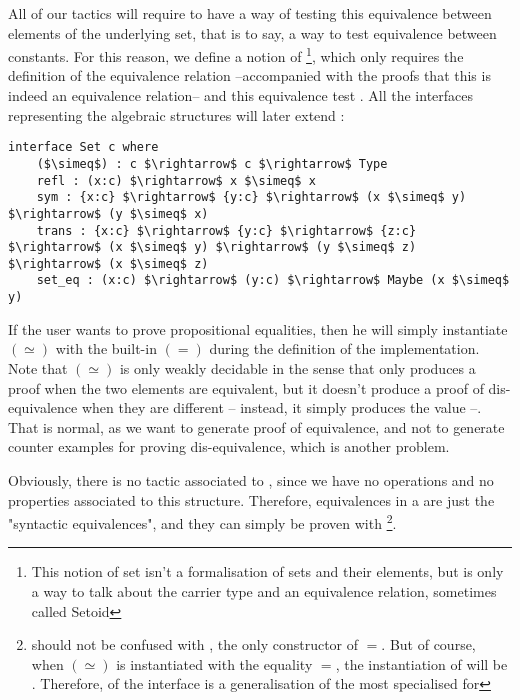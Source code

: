 All of our tactics will require to have a way of testing this equivalence between elements of the underlying set, that is to say, a way to test equivalence between constants. For this reason, we define a notion of \footnote{This notion of set isn't a formalisation of sets and their elements, but is only a way to talk about the carrier type and an equivalence relation, sometimes called Setoid}, which only requires the definition of the equivalence relation --accompanied with the proofs that this is indeed an equivalence relation-- and this equivalence test . All the interfaces representing the algebraic structures will later extend  :

\begin{lstlisting}
interface Set c where
    ($\simeq$) : c $\rightarrow$ c $\rightarrow$ Type
    refl : (x:c) $\rightarrow$ x $\simeq$ x
    sym : {x:c} $\rightarrow$ {y:c} $\rightarrow$ (x $\simeq$ y) $\rightarrow$ (y $\simeq$ x)
    trans : {x:c} $\rightarrow$ {y:c} $\rightarrow$ {z:c} $\rightarrow$ (x $\simeq$ y) $\rightarrow$ (y $\simeq$ z) $\rightarrow$ (x $\simeq$ z)    
    set_eq : (x:c) $\rightarrow$ (y:c) $\rightarrow$ Maybe (x $\simeq$ y)
\end{lstlisting}

If the user wants to prove propositional equalities, then he will simply instantiate $(\simeq)$ with the built-in $(=)$ during the definition of the  implementation.
Note that $(\simeq)$ is only weakly decidable in the sense that  only produces a proof when the two elements are equivalent, but it doesn't produce a proof of dis-equivalence when they are different -- instead, it simply produces the value --. That is normal, as we want to generate proof of equivalence, and not to generate counter examples for proving dis-equivalence, which is another problem.

Obviously, there is no tactic associated to , since we have no operations and no properties associated to this structure. Therefore, equivalences in a  are just the "syntactic equivalences", and they can simply be proven with \footnote{ should not be confused with , the only constructor of $=$. But of course, when $(\simeq)$ is instantiated with the equality $=$, the instantiation of  will be . Therefore,  of the interface  is a generalisation of the most specialised  for \code{=}}.


